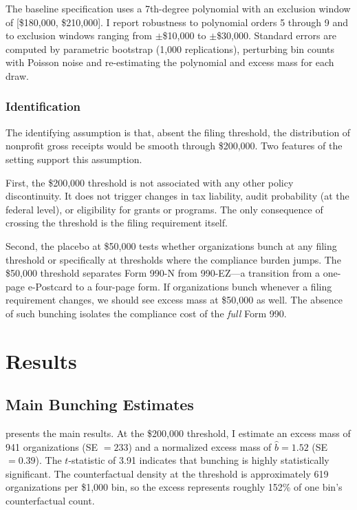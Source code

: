 \documentclass[12pt]{article}
\begin{document}
The baseline specification uses a 7th-degree polynomial with an exclusion window of [\$180,000, \$210,000]. I report robustness to polynomial orders 5 through 9 and to exclusion windows ranging from $\pm$\$10,000 to $\pm$\$30,000. Standard errors are computed by parametric bootstrap (1,000 replications), perturbing bin counts with Poisson noise and re-estimating the polynomial and excess mass for each draw.

\subsubsection*{Identification} The identifying assumption is that, absent the filing threshold, the distribution of nonprofit gross receipts would be smooth through \$200,000. Two features of the setting support this assumption.

First, the \$200,000 threshold is not associated with any other policy discontinuity. It does not trigger changes in tax liability, audit probability (at the federal level), or eligibility for grants or programs. The only consequence of crossing the threshold is the filing requirement itself.

Second, the placebo at \$50,000 tests whether organizations bunch at any filing threshold or specifically at thresholds where the compliance burden jumps. The \$50,000 threshold separates Form 990-N from 990-EZ---a transition from a one-page e-Postcard to a four-page form. If organizations bunch whenever a filing requirement changes, we should see excess mass at \$50,000 as well. The absence of such bunching isolates the compliance cost of the \textit{full} Form 990.

\section{Results}

\subsection{Main Bunching Estimates}

 presents the main results. At the \$200,000 threshold, I estimate an excess mass of 941 organizations (SE $= 233$) and a normalized excess mass of $\hat{b} = 1.52$ (SE $= 0.39$). The $t$-statistic of 3.91 indicates that bunching is highly statistically significant. The counterfactual density at the threshold is approximately 619 organizations per \$1,000 bin, so the excess represents roughly 152\% of one bin's counterfactual count.
\end{document}
